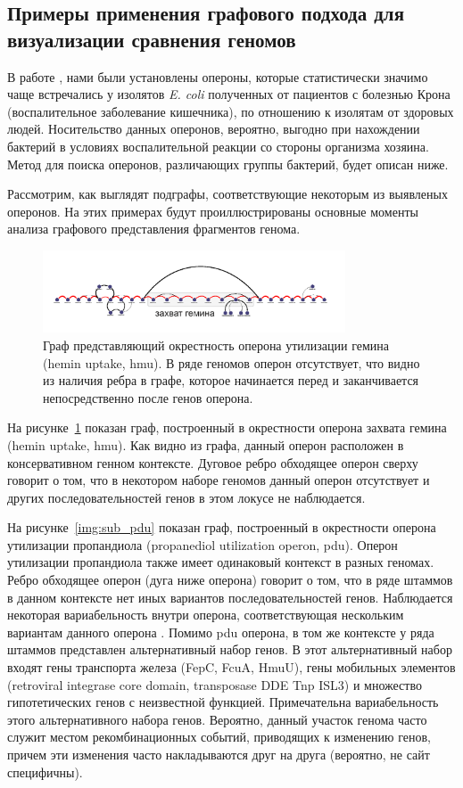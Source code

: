 \subsection*{Примеры применения графового подхода для визуализации сравнения геномов}

В работе \cite{rakitina2017genome}, нами были установлены опероны, которые статистически значимо чаще встречались у изолятов \textit{E. coli} полученных от пациентов с болезнью Крона (воспалительное заболевание кишечника), по отношению к изолятам от здоровых людей. Носительство данных оперонов, вероятно, выгодно при нахождении бактерий в условиях воспалительной реакции со стороны организма хозяина. Метод для поиска оперонов, различающих группы бактерий, будет описан ниже.

Рассмотрим, как выглядят подграфы, соответствующие некоторым из выявленых оперонов. На этих примерах будут проиллюстрированы основные моменты анализа графового представления фрагментов генома. 


\begin{figure}[!ht] 
  \center
  \includegraphics[width=0.8\textwidth]{Dissertation/images/subgraphs/hemin.png}
  \caption{Граф представляющий окрестность оперона утилизации гемина (hemin uptake, hmu). В ряде геномов оперон отсутствует, что видно из наличия ребра в графе, которое начинается перед и заканчивается непосредственно после генов оперона. }
  \label{img:sub_hem} 
\end{figure}

На рисунке~\ref{img:sub_hem} показан граф, построенный в окрестности оперона захвата гемина (hemin uptake, hmu). Как видно из графа, данный оперон расположен в консервативном генном контексте. Дуговое ребро обходящее оперон сверху говорит о том, что в некотором наборе геномов данный оперон отсутствует и других последовательностей генов в этом локусе не наблюдается. 

На рисунке~\ref{img:sub_pdu} показан граф, построенный в окрестности оперона утилизации пропандиола (propanediol utilization operon, pdu). Оперон утилизации пропандиола также имеет одинаковый контекст в разных геномах. Ребро обходящее оперон (дуга ниже оперона) говорит о том, что в ряде штаммов в данном контексте нет иных вариантов последовательностей генов. Наблюдается некоторая вариабельность внутри оперона, соответствующая нескольким вариантам данного оперона \cite{rakitina2017genome}. Помимо pdu оперона, в том же контексте у ряда штаммов представлен альтернативный набор генов. В этот альтернативный набор входят гены транспорта железа (FepC, FcuA, HmuU), гены мобильных элементов (retroviral integrase core domain, transposase DDE Tnp ISL3) и множество гипотетических генов с неизвестной функцией. Примечательна вариабельность этого альтернативного набора генов. Вероятно, данный участок генома часто служит местом рекомбинационных событий, приводящих к изменению генов, причем эти изменения часто накладываются друг на друга (вероятно, не сайт специфичны). 


